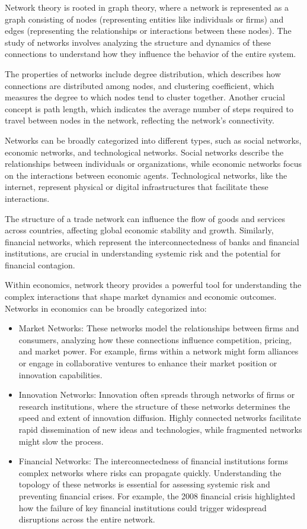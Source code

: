 Network theory is rooted in graph theory, where a network is represented as a graph consisting of nodes (representing entities like individuals or firms) and edges (representing the relationships or interactions between these nodes). The study of networks involves analyzing the structure and dynamics of these connections to understand how they influence the behavior of the entire system.

The properties of networks include degree distribution, which describes how connections are distributed among nodes, and clustering coefficient, which measures the degree to which nodes tend to cluster together. Another crucial concept is path length, which indicates the average number of steps required to travel between nodes in the network, reflecting the network's connectivity.

Networks can be broadly categorized into different types, such as social networks, economic networks, and technological networks. Social networks describe the relationships between individuals or organizations, while economic networks focus on the interactions between economic agents. Technological networks, like the internet, represent physical or digital infrastructures that facilitate these interactions.

The structure of a trade network can influence the flow of goods and services across countries, affecting global economic stability and growth. Similarly, financial networks, which represent the interconnectedness of banks and financial institutions, are crucial in understanding systemic risk and the potential for financial contagion.

Within economics, network theory provides a powerful tool for understanding the complex interactions that shape market dynamics and economic outcomes. Networks in economics can be broadly categorized into:

\begin{itemize}
    \item Market Networks: These networks model the relationships between firms and consumers, analyzing how these connections influence competition, pricing, and market power. For example, firms within a network might form alliances or engage in collaborative ventures to enhance their market position or innovation capabilities.
    \item Innovation Networks: Innovation often spreads through networks of firms or research institutions, where the structure of these networks determines the speed and extent of innovation diffusion. Highly connected networks facilitate rapid dissemination of new ideas and technologies, while fragmented networks might slow the process.
    \item Financial Networks: The interconnectedness of financial institutions forms complex networks where risks can propagate quickly. Understanding the topology of these networks is essential for assessing systemic risk and preventing financial crises. For example, the 2008 financial crisis highlighted how the failure of key financial institutions could trigger widespread disruptions across the entire network.
\end{itemize}

